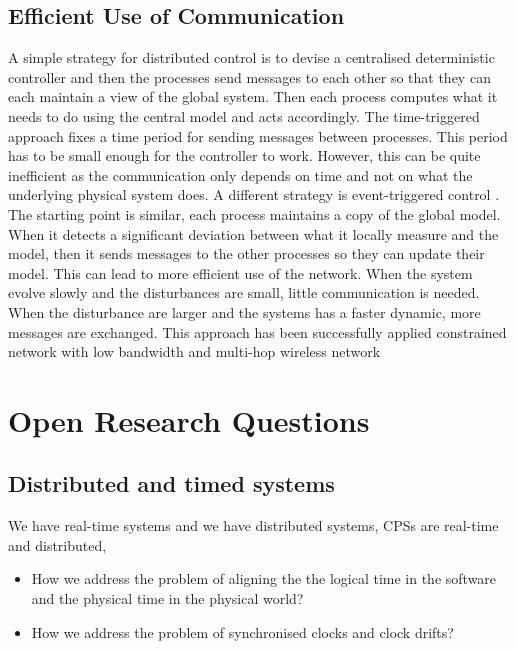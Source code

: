 \documentclass[
graybox,
envcountchap
]{svmult}
\begin{document}
\begin{bibunit}
    \subsection{Efficient Use of Communication}

   A simple strategy for distributed control is to devise a centralised deterministic controller and then the processes send messages to each other so that they can each maintain a view of the global system.
    Then each process computes what it needs to do using the central model and acts accordingly.
    The time-triggered approach fixes a time period for sending messages between processes.
    This period has to be small enough for the controller to work.
    However, this can be quite inefficient as the communication only depends on time and not on what the underlying physical system does.
    A different strategy is event-triggered control \cite{Lemmon2010}.
    The starting point is similar, each process maintains a copy of the global model.
    When it detects a significant deviation between what it locally measure and the model, then it sends messages to the other processes so they can update their model.
    This can lead to more efficient use of the network.
    When the system evolve slowly and the disturbances are small, little communication is needed.
    When the disturbance are larger and the systems has a faster dynamic, more messages are exchanged.
    This approach has been successfully applied constrained network with low bandwidth \cite{DBLP:conf/icra/TrimpeB15} and multi-hop wireless network \cite{DBLP:journals/csysl/BaumannMZT20}


\section{Open Research Questions} %

   \subsection{Distributed and timed systems}
   
   We have real-time systems and we have distributed systems, CPSs are real-time and distributed, 
   \begin{itemize}
    \item How we address the problem of aligning the  the logical time in the software and the physical time in the physical world? 
    \item How we address the problem of synchronised clocks and clock drifts?
    \end{itemize}
   

\end{bibunit}
\end{document}
